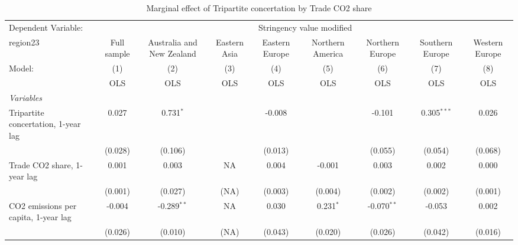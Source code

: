 
\begin{table}[htbp]
   \caption{Marginal effect of Tripartite concertation by Trade CO2 share}
   \centering
   \begin{tabular}{lcccccccc}
      \toprule
      Dependent Variable: & \multicolumn{8}{c}{Stringency value modified}\\
      region23                                                          & Full sample    & Australia and New Zealand & Eastern Asia & Eastern Europe & Northern America & Northern Europe & Southern Europe & Western Europe \\   
      Model:                                                            & (1)            & (2)                       & (3)          & (4)            & (5)              & (6)             & (7)             & (8)\\  
                                                                        &  OLS           & OLS                       & OLS          & OLS            & OLS              & OLS             & OLS             & OLS\\  
      \midrule
      \emph{Variables}\\
      Tripartite concertation, 1-year lag                               & 0.027          & 0.731$^{*}$               &              & -0.008         &                  & -0.101          & 0.305$^{***}$   & 0.026\\   
                                                                        & (0.028)        & (0.106)                   &              & (0.013)        &                  & (0.055)         & (0.054)         & (0.068)\\   
      Trade CO2 share, 1-year lag                                       & 0.001          & 0.003                     & NA           & 0.004          & -0.001           & 0.003           & 0.002           & 0.000\\   
                                                                        & (0.001)        & (0.027)                   & (NA)         & (0.003)        & (0.004)          & (0.002)         & (0.002)         & (0.001)\\   
      CO2 emissions per capita, 1-year lag                              & -0.004         & -0.289$^{**}$             & NA           & 0.030          & 0.231$^{*}$      & -0.070$^{**}$   & -0.053          & 0.002\\   
                                                                        & (0.026)        & (0.010)                   & (NA)         & (0.043)        & (0.020)          & (0.026)         & (0.042)         & (0.016)\\   

\end{tabular}
\end{table}
